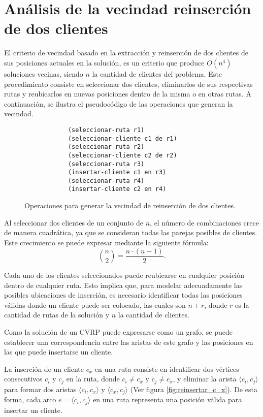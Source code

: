 \documentclass[12pt]{report}
\begin{document}
	\section{Análisis de la vecindad reinserción de dos clientes}
	\label{sec:Análisis de la vecindad reinserción de dos clientes}
	El criterio de vecindad basado en la extracción y reinserción de dos clientes de sus posiciones actuales en la solución, es un criterio que produce $O(n^4)$ soluciones vecinas, siendo $n$ la cantidad de clientes del problema. Este procedimiento consiste en seleccionar dos clientes, eliminarlos de sus respectivas rutas y reubicarlos en nuevas posiciones dentro de la misma o en otras rutas. A continuación, se ilustra el pseudocódigo de las operaciones que generan la vecindad.
	\begin{figure}[h]
			\begin{verbatim}
			(seleccionar-ruta r1)
			(seleccionar-cliente c1 de r1)
			(seleccionar-ruta r2)
			(seleccionar-cliente c2 de r2)
			(seleccionar-ruta r3)
			(insertar-cliente c1 en r3)
			(seleccionar-ruta r4)
			(insertar-cliente c2 en r4)
		\end{verbatim}
		\caption{Operaciones para generar la vecindad de reinserción de dos clientes.}
		\label{fig:ejemplo_de_criterio}
	\end{figure}


	Al seleccionar dos clientes de un conjunto de $n$, el número de combinaciones crece de manera cuadrática, ya que se consideran todas las parejas posibles de clientes. Este crecimiento se puede expresar mediante la siguiente fórmula:
	\[
	\binom{n}{2} = \frac{n\cdot (n-1)}{2}\text{.}
	\]

	 Cada uno de los clientes seleccionados puede reubicarse en cualquier posición dentro de cualquier ruta. Esto implica que, para modelar adecuadamente las posibles ubicaciones de inserción, es necesario identificar todas las posiciones válidas donde un cliente puede ser colocado, las cuales son $n + r$, donde $r$ es la cantidad de rutas de la solución y $n$ la cantidad de clientes.

	Como la solución de un CVRP puede expresarse como un grafo, se puede establecer una correspondencia entre las aristas de este grafo y las posiciones en las que puede insertarse un cliente.


	La inserción de un cliente $c_x$ en una ruta consiste en identificar dos vértices consecutivos $c_i$ y $c_j$ en la ruta, donde $c_i \neq c_x$ y $c_j \neq c_x$, y eliminar la arista $\langle c_i,c_j \rangle$ para formar dos aristas $\langle c_i,c_x \rangle$ y $\langle c_x,c_j \rangle$ (Ver figura \ref{fig:reinsertar_c_x}). De esta forma, cada arco $e = \langle c_i,c_j \rangle$ en una ruta representa una posición válida para insertar un cliente.
\end{document}
